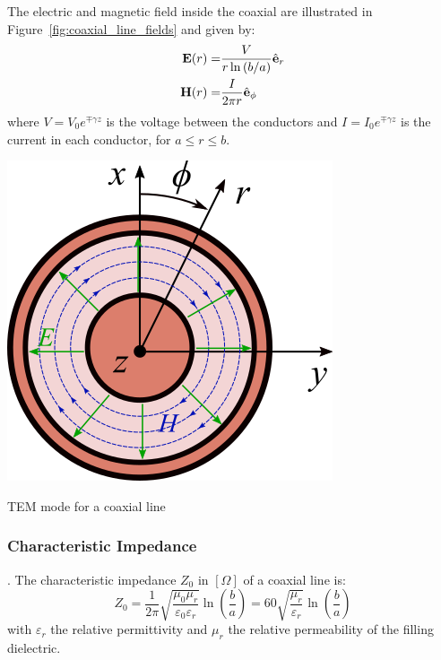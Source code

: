 The electric and magnetic field inside the coaxial are illustrated in Figure~\ref{fig:coaxial_line_fields} and given by:
\begin{subequations}
	\begin{align}
		{\mathbf E}(r) =& \frac{V}{r \ln \left(b/a \right)} \hat{{\mathbf e}}_r \label{eq:coaxial_electric_field}\\
		{\mathbf H}(r) =& \frac{I}{2\pi r} \hat{{\mathbf e}}_\phi \label{eq:coaxial_magnetic_field}
	\end{align}
	
\end{subequations}
where $V=V_0 e^{\mp\gamma z}$ is the voltage between the conductors and $I=I_0 e^{\mp\gamma z}$ is the current in each conductor, for $a\leqslant r \leqslant b$. 

\begin{marginfigure}[*-8]
	\includegraphics[width=.8\linewidth]{figures/chap3/coaxial_fields}
	\caption{TEM mode for a coaxial line}
	\label{fig:coaxial_line_fields}
\end{marginfigure}	

\subsubsection{Characteristic Impedance}. 
The characteristic impedance $Z_0$ in $[\si{\Omega}]$ of a coaxial line is:
\begin{equation}
Z_0 = 
	\frac{1}{2\pi} \sqrt{\frac{\mu_0 \mu_r}{\varepsilon_{0} \varepsilon_{r}}} \ln\left( \frac{b}{a} \right)
	=
	60 \sqrt{\frac{\mu_r}{\varepsilon_{r}}} \ln\left( \frac{b}{a} \right) 
\end{equation}
with $\varepsilon_{r}$ the relative permittivity and $\mu_r$ the relative permeability of the filling dielectric. 

